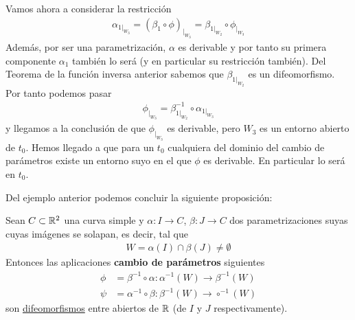 \begin{ejemplo}
    Vamos ahora a considerar la restricción
    \begin{gather*}
        \alpha_{1|_{W_3}} = (\beta_1\circ \phi)_{|_{W_3}} = \beta_{1|_{W_2}} \circ \phi_{|_{W_3}}
    \end{gather*}
    Además, por ser una parametrización, $\alpha$ es derivable y por tanto su primera componente $\alpha_1$ también lo será (y en particular su restricción también). Del Teorema de la función inversa anterior sabemos que $\beta_{1|_{W_2}}$ es un difeomorfismo. Por tanto podemos pasar 
    \begin{gather*}
        \phi_{|_{W_3}} = \beta_{1|_{W_2}}^{-1} \circ \alpha_{1|_{W_3}}
    \end{gather*}
    y llegamos a la conclusión de que $\phi_{|_{W_3}}$ es derivable, pero $W_3$ es un entorno abierto de $t_0$. Hemos llegado a que para un $t_0$ cualquiera del dominio del cambio de parámetros existe un entorno suyo en el que $\phi$ es derivable. En particular lo será en $t_0$.
\end{ejemplo}


Del ejemplo anterior podemos concluir la siguiente proposición:
\begin{prop}
    Sean $C\subset \mathbb{R}^2$ una curva simple y $\alpha:I \to C$, $\beta: J \to C$ dos parametrizaciones suyas cuyas imágenes se solapan, es decir, tal que 
    \begin{gather*}
        W = \alpha(I)\cap \beta(J) \neq \emptyset
    \end{gather*}
    Entonces las aplicaciones \textbf{cambio de parámetros} siguientes
    \begin{align*}
        \phi &= \beta^{-1}\circ \alpha : \alpha^{-1}(W) \to \beta^{-1}(W)\\
        \psi &= \alpha^{-1}\circ \beta : \beta^{-1}(W) \to \circ^{-1}(W)
    \end{align*}
    son \underline{difeomorfismos} entre abiertos de $\mathbb{R}$ (de $I$ y $J$ respectivamente).
\end{prop}

